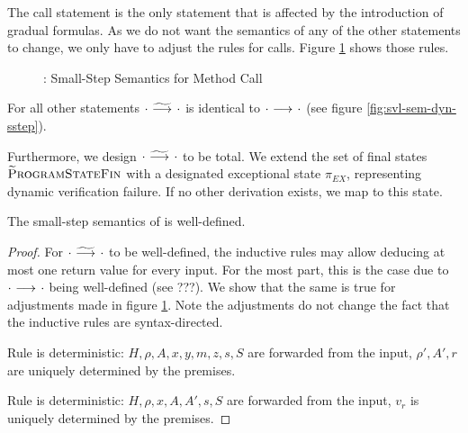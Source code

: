 The call statement is the only statement that is affected by the introduction of gradual formulas.
As we do not want the semantics of any of the other statements to change, we only have to adjust the rules for calls.
Figure \ref{fig:gvl-sem-dyn-sstep} shows those rules.
\begin{figure}
    \boxed{\gsstep{\pi}{\pi}}
    
    \caption{\gvlidf: Small-Step Semantics for Method Call}
    \label{fig:gvl-sem-dyn-sstep}
\end{figure}
For all other statements ${\cdot} \,\,{\widetilde{\longrightarrow}^{}}\,\, {\cdot}$ is identical to ${\cdot} \,\,{\longrightarrow^{}}\,\, {\cdot}$ (see figure \ref{fig:svl-sem-dyn-sstep}).

Furthermore, we design ${\cdot} \,\,{\widetilde{\longrightarrow}^{}}\,\, {\cdot}$ to be total.
We extend the set of final states $\textup{\textsc{\ensuremath{\widetilde{\text{P}}}rogramStateFin}}$ with a designated exceptional state $\pi_{EX}$, representing dynamic verification failure.
If no other derivation exists, we map to this state.

\begin{lemma}
    The small-step semantics of \gvlidf is well-defined.
\end{lemma}
\begin{proof}
    For ${\cdot} \,\,{\widetilde{\longrightarrow}^{}}\,\, {\cdot}$ to be well-defined, the inductive rules may allow deducing at most one return value for every input.
    For the most part, this is the case due to ${\cdot} \,\,{\longrightarrow^{}}\,\, {\cdot}$ being well-defined (see ???).
    We show that the same is true for adjustments made in figure \ref{fig:gvl-sem-dyn-sstep}.
    Note the adjustments do not change the fact that the inductive rules are syntax-directed.
    
    Rule  is deterministic:
    $H, \rho, A, x, y, m, z, s, S$ are forwarded from the input, $\rho', A', r$ are uniquely determined by the premises.
    
    Rule  is deterministic:
    $H, \rho, x, A, A', s, S$ are forwarded from the input, $v_r$ is uniquely determined by the premises.
\end{proof}

